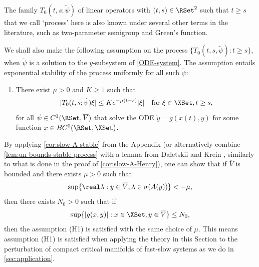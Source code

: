 \documentclass[a4paper]{siamart190516}
\begin{document}
 \begin{remark}
The family $T_0(t,s; \tilde{\psi})$ of linear operators with $(t,s) \in \RSet^2$ such that $t \geq s$ that we call `process' here is also known under several other terms in the literature, such as two-parameter semigroup and Green's function.
 \end{remark}
 
 We shall also make the following assumption on the process $\{ T_0(t,s, \tilde{\psi}): t \geq s \}$, when $\tilde{\psi}$ is a solution to the $y$-subsystem of \cref{ODE-system}. The assumption entails exponential stability of the process uniformly for all such $\tilde{\psi}$:
 \vspace{0.2cm}
 
 \begin{enumerate}
 \item[$\mathrm{(H1)}$] There exist $\mu>0$ and  $K \geq 1$ such that 
\begin{equation}\label{eq:process-exp-bdd}
| T_0(t,s; \tilde{\psi}) \xi | \leq K e^{-\mu(t-s)} |\xi| \quad \text{for } \xi \in \XSet, t \geq s,
\end{equation}
for all $\tilde{\psi} \in C^1(\RSet,\overline{V})$ that solve the ODE $\dot{y} = g(x(t),y)$ for some function $x\in BC^{0}(\RSet, \XSet)$. 
 \end{enumerate}
 
 \begin{remark}\label{rem:spectral-gap-to-H1}
By applying \cref{cor:slow-A-stable} from the Appendix (or alternatively combine
\cref{lem:un-bounds-stable-process} with a lemma from Daletskii and Krein
\cite{DaKr74}, similarly to what is done in the proof of \cref{cor:slow-A-Henry}), one can show that if $\overline{V}$ is bounded and there
exists $\mu > 0$ such that
\[
\sup \{ \real \lambda: y \in \overline{V}, \lambda \in \sigma(A(y)) \} < -\mu,
\]
then there exists $N_0 > 0$ such that if
\[
\sup \{ | g(x,y) | : x \in \XSet, y \in \overline{V} \} \leq N_0,
\]
then the assumption (H1) is satisfied with the same choice of $\mu$. This means
assumption (H1) is satisfied when applying the theory in this Section to the
perturbation of compact critical manifolds of fast-slow systems as we do in \cref{sec:application}.
 \end{remark}
 
\end{document}
